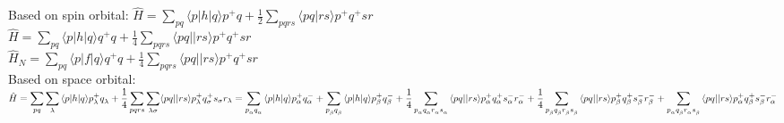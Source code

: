 \documentclass[14pt]{article}
\begin{document}
    \newpage
    \noindent
    Based on spin orbital:
    $\hat{H} = \displaystyle\sum_{pq}^{}\langle{p}\vert{h}\vert{q}\rangle{p}^{+}{q} + \frac{1}{2}\displaystyle\sum_{pqrs}^{}\langle{pq}\vert{rs}\rangle{p}^{+}{q}^{+}{sr}$ \\
    $\hat{H} = \displaystyle\sum_{pq}^{}\langle{p}\vert{h}\vert{q}\rangle{q}^{+}{q} + \frac{1}{4}\displaystyle\sum_{pqrs}^{}\langle{pq}\vert{}\vert{rs}\rangle{p}^{+}{q}^{+}{sr}$ \\
    $\hat{H}_{N} = \displaystyle\sum_{pq}^{}\langle{p}\vert{f}\vert{q}\rangle{q}^{+}{q} + \frac{1}{4}\displaystyle\sum_{pqrs}^{}\langle{pq}\vert{}\vert{rs}\rangle{p}^{+}{q}^{+}{sr}$ \\
    \newline
    Based on space orbital: \\
    $\hat{H} = \displaystyle\sum_{pq}^{}{\displaystyle\sum_{\lambda}^{}{\langle{p}\vert{h}\vert{q}\rangle{p}_{\lambda}^{+}{q}_{\lambda}^{}}}
             + \frac{1}{4}\displaystyle\sum_{pqrs}^{}\displaystyle\sum_{\lambda\sigma}^{}\langle{pq}\vert{}\vert{rs}\rangle{p}_{\lambda}^{+}{q}_{\sigma}^{+}{s}_{\sigma}{r}_{\lambda} \\
             = \displaystyle\sum_{{p}_{\alpha}^{}{q}_{\alpha}^{}}^{}{\langle{p}\vert{h}\vert{q}\rangle{p}_{\alpha}^{+}{q}_{\alpha}^{-}}
             + \displaystyle\sum_{{p}_{\beta}^{}{q}_{\beta}^{}}^{}{\langle{p}\vert{h}\vert{q}\rangle{p}_{\beta}^{+}{q}_{\beta}^{-}} \\
             + \frac{1}{4}\displaystyle\sum_{{p}_{\alpha}^{}{q}_{\alpha}^{}{r}_{\alpha}^{}{s}_{\alpha}^{}}^{}{\langle{pq}\vert{}\vert{rs}\rangle{p}_{\alpha}^{+}{q}_{\alpha}^{+}{s}_{\alpha}^{-}{r}_{\alpha}^{-}}
             + \frac{1}{4}\displaystyle\sum_{{p}_{\beta}^{}{q}_{\beta}^{}{r}_{\beta}^{}{s}_{\beta}^{}}^{}{\langle{pq}\vert{}\vert{rs}\rangle{p}_{\beta}^{+}{q}_{\beta}^{+}{s}_{\beta}^{-}{r}_{\beta}^{-}}
             + \displaystyle\sum_{{p}_{\alpha}^{}{q}_{\beta}^{}{r}_{\alpha}^{}{s}_{\beta}^{}}^{}{\langle{pq}\vert{}\vert{rs}\rangle{p}_{\alpha}^{+}{q}_{\beta}^{+}{s}_{\beta}^{-}{r}_{\alpha}^{-}}


    $ \\
    \newline
\end{document}
